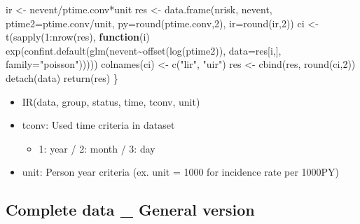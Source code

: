 \documentclass[
]{book}
\newenvironment{Shaded}{\begin{snugshade}}{\end{snugshade}}
\newcommand{\AttributeTok}[1]{\textcolor[rgb]{0.77,0.63,0.00}{#1}}
\newcommand{\ControlFlowTok}[1]{\textcolor[rgb]{0.13,0.29,0.53}{\textbf{#1}}}
\newcommand{\DecValTok}[1]{\textcolor[rgb]{0.00,0.00,0.81}{#1}}
\newcommand{\FunctionTok}[1]{\textcolor[rgb]{0.00,0.00,0.00}{#1}}
\newcommand{\NormalTok}[1]{#1}
\newcommand{\OtherTok}[1]{\textcolor[rgb]{0.56,0.35,0.01}{#1}}
\newcommand{\SpecialCharTok}[1]{\textcolor[rgb]{0.00,0.00,0.00}{#1}}
\newcommand{\StringTok}[1]{\textcolor[rgb]{0.31,0.60,0.02}{#1}}
\providecommand{\tightlist}{%
  \setlength{\itemsep}{0pt}\setlength{\parskip}{0pt}}
\begin{document}
\begin{Shaded}
\begin{Highlighting}[]
\NormalTok{  ir }\OtherTok{\textless{}{-}}\NormalTok{ nevent}\SpecialCharTok{/}\NormalTok{ptime.conv}\SpecialCharTok{*}\NormalTok{unit}
\NormalTok{  res }\OtherTok{\textless{}{-}} \FunctionTok{data.frame}\NormalTok{(nrisk, nevent, }\AttributeTok{ptime2=}\NormalTok{ptime.conv}\SpecialCharTok{/}\NormalTok{unit, }\AttributeTok{py=}\FunctionTok{round}\NormalTok{(ptime.conv,}\DecValTok{2}\NormalTok{), }\AttributeTok{ir=}\FunctionTok{round}\NormalTok{(ir,}\DecValTok{2}\NormalTok{))}
\NormalTok{  ci }\OtherTok{\textless{}{-}} \FunctionTok{t}\NormalTok{(}\FunctionTok{sapply}\NormalTok{(}\DecValTok{1}\SpecialCharTok{:}\FunctionTok{nrow}\NormalTok{(res), }\ControlFlowTok{function}\NormalTok{(i) }\FunctionTok{exp}\NormalTok{(}\FunctionTok{confint.default}\NormalTok{(}\FunctionTok{glm}\NormalTok{(nevent}\SpecialCharTok{\textasciitilde{}}\FunctionTok{offset}\NormalTok{(}\FunctionTok{log}\NormalTok{(ptime2)), }\AttributeTok{data=}\NormalTok{res[i,], }\AttributeTok{family=}\StringTok{"poisson"}\NormalTok{)))))}
  \FunctionTok{colnames}\NormalTok{(ci) }\OtherTok{\textless{}{-}} \FunctionTok{c}\NormalTok{(}\StringTok{"lir"}\NormalTok{, }\StringTok{"uir"}\NormalTok{)}
\NormalTok{  res }\OtherTok{\textless{}{-}} \FunctionTok{cbind}\NormalTok{(res, }\FunctionTok{round}\NormalTok{(ci,}\DecValTok{2}\NormalTok{))}
  \FunctionTok{detach}\NormalTok{(data)}
  \FunctionTok{return}\NormalTok{(res)}
\NormalTok{\}}
\end{Highlighting}
\end{Shaded}

\begin{itemize}
\tightlist
\item
  IR(data, group, status, time, tconv, unit)
\item
  tconv: Used time criteria in dataset

  \begin{itemize}
  \tightlist
  \item
    1: year / 2: month / 3: day
  \end{itemize}
\item
  unit: Person year criteria (ex. unit = 1000 for incidence rate per 1000PY)
\end{itemize}

\hypertarget{complete-data-_-general-version}{%
\subsection{Complete data \_ General version}\label{complete-data-_-general-version}}
\end{document}
